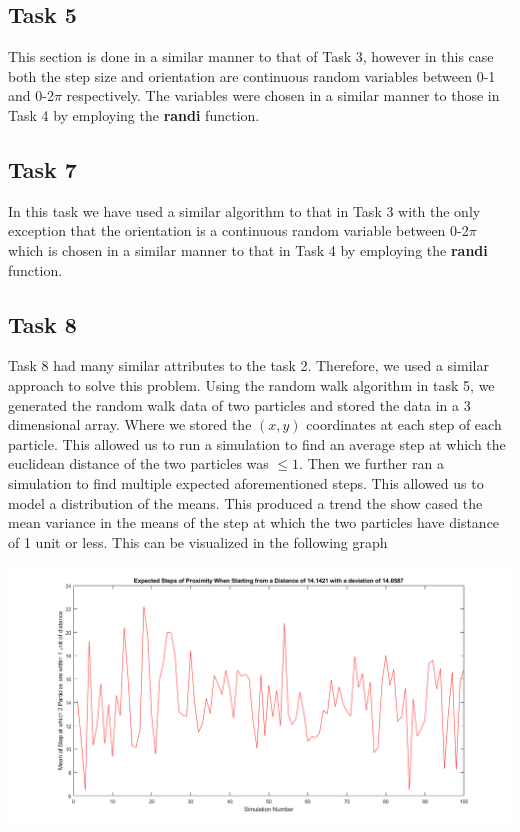\documentclass{article}
\begin{document}
\subsection{Task 5}
This section is done in a similar manner to that of Task 3, however in this case both the step size and orientation are continuous random variables between 0-1 and 0-2$\pi$ respectively. The variables were chosen in a similar manner to those in Task 4 by employing the \textbf{randi} function.
\subsection{Task 7}
In this task we have used a similar algorithm to that in Task 3 with the only exception that the orientation is a continuous random variable between 0-2$\pi$ which is chosen in a similar manner to that in Task 4 by employing the \textbf{randi} function. 
\subsection{Task 8}
Task 8 had many similar attributes to the task 2. Therefore, we used a similar approach to solve this problem. Using the random walk algorithm in task 5, we generated the random walk data
of two particles and stored the data in a 3 dimensional array. Where we stored the $(x,y)$ coordinates at each step of each particle. This allowed us to run a simulation to find an average 
step at which the euclidean distance of the two particles was $\leq 1$. Then we further ran a simulation to find multiple expected aforementioned steps. This allowed us to model a distribution 
of the means. This produced a trend the show cased the mean variance in the means of the step at which the two particles have distance of 1 unit or less. This can be visualized in the following 
graph


\begin{center}
    \includegraphics[scale = 0.4]{Meandist.png}
\end{center}
\end{document}
